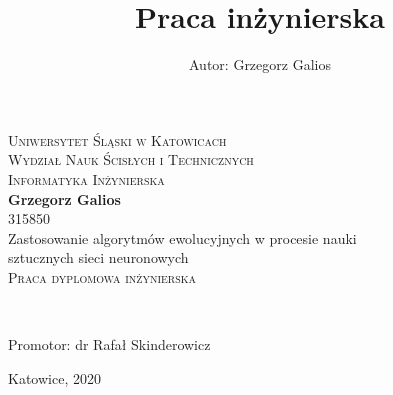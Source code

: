\newpage
\thispagestyle{empty}

\begin{onehalfspacing}
\begin{center}

\centering
\title{Praca inżynierska}
\author{Autor: Grzegorz Galios}

{\fontsize{17}{17}}\selectfont
\textsc{Uniwersytet Śląski w Katowicach \\[.3cm]
Wydział Nauk Ścisłych i Technicznych  \\[.3cm]
Informatyka Inżynierska  \\[2.5cm]}
\textbf{\large{Grzegorz Galios}} \\
315850\\[1cm]

\large 
{Zastosowanie algorytmów ewolucyjnych w procesie nauki \\
sztucznych sieci neuronowych} \\[.5cm]
\textsc{Praca dyplomowa inżynierska}
\end{center} ~\\[3cm]

\large
\begin{flushright}
Promotor: dr Rafał Skinderowicz \\
\end{flushright}

\begin{bottompar}
\begin{flushright}
Katowice, 2020
\end{flushright}
\end{bottompar}
\end{onehalfspacing}

\setcounter{page}{0} \pagestyle{plain}

\pagestyle{fancy}
